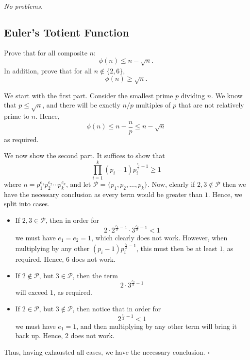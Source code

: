 \documentclass{article}
\newcommand{\noproblems}{\emph{No problems.}}
\begin{document}
\noproblems

\subsection{Euler's Totient Function}

\begin{problem}[3.3.1]{}
Prove that for all composite $n$: \[\phi(n) \le n - \sqrt{n}.\] In addition, prove that for all $n \not\in \{2, 6\}$, \[\phi(n) \ge \sqrt{n}.\]
\end{problem}

We start with the first part. Consider the smallest prime $p$ dividing $n$. We know that $p \le \sqrt{n}$, and there will be exactly $n/p$ multiples of $p$ that are not relatively prime to $n$. Hence, \[\phi(n) \le n-\dfrac{n}{p} \le n-\sqrt{n}\] as required. 

We now show the second part. It suffices to show that \[\prod_{i=1}^k (p_i-1)p_i^{\tfrac{e_i}{2}-1} \ge 1\] where $n = p_1^{e_1}p_2^{e_2}\cdots p_k^{e_k}$, and let $\mathcal{P} = \{p_1, p_2, \dots, p_k\}$. Now, clearly if $2, 3 \not\in \mathcal{P}$ then we have the necessary conclusion as every term would be greater than $1$. Hence, we split into cases.
\begin{itemize}
\item If $2, 3 \in \mathcal{P}$, then in order for \[2\cdot 2^{\tfrac{e_1}{2}-1}\cdot 3^{\tfrac{e_2}{2}-1}< 1\] we must have $e_1 = e_2 = 1$, which clearly does not work. However, when multiplying by any other $(p_i-1)p_i^{\tfrac{e_i}{2}-1}$, this must then be at least $1$, as required. Hence, $6$ does not work.
\item If $2 \not\in \mathcal{P}$, but $3 \in \mathcal{P}$, then the term \[2 \cdot 3^{\tfrac{e_2}{2}-1}\] will exceed $1$, as required.
\item If $2 \in \mathcal{P}$, but $3 \not\in \mathcal{P}$, then notice that in order for \[2^{\tfrac{e_1}{2}-1}< 1\] we must have $e_1 = 1$, and then multiplying by any other term will bring it back up. Hence, $2$ does not work.
\end{itemize}
Thus, having exhausted all cases, we have the necessary conclusion. $\square$
\end{document}
